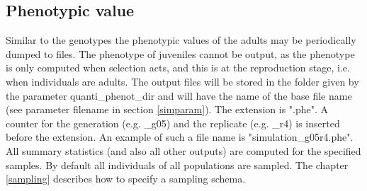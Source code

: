 \documentclass[letterpaper,12pt,oneside]{book}
\begin{document}
\subsection{Phenotypic value}\label{phenoQuanti}
Similar to the genotypes the phenotypic values of the adults may be periodically dumped to files. The phenotype of juveniles cannot be output, as the phenotype is only computed when selection acts, and this is at the reproduction stage, i.e. when individuals are adults. The output files will be stored in the folder given by the parameter \textsf{quanti\_phenot\_dir} and will have the name of the base file name (see parameter \textsf{filename} in section \ref{simparam}). The extension is ".phe". A counter for the generation (e.g. \_g05) and the replicate (e.g. \_r4) is inserted before the extension. An example of such a file name is \textsf{"simulation\_g05r4.phe"}. All summary statistics (and also all other outputs) are computed for the specified samples. By default all individuals of all populations are sampled. The chapter \ref{sampling} describes how to specify a sampling schema.
\end{document}

